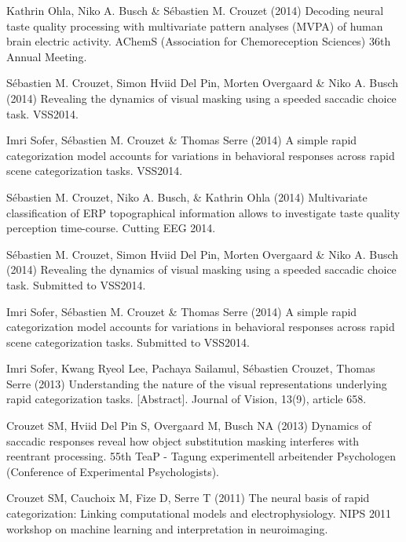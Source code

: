 \documentclass[margin,line]{resume}
\begin{document}
\begin{resume}
	\footnotesize %
	
	Kathrin Ohla, Niko A. Busch \& Sébastien M. Crouzet (2014) Decoding neural taste quality processing with multivariate pattern analyses (MVPA) of human brain electric activity. AChemS (Association for Chemoreception Sciences) 36th Annual Meeting.

	\vspace{-2mm} Sébastien M. Crouzet, Simon Hviid Del Pin, Morten Overgaard \& Niko A. Busch (2014) Revealing the dynamics of visual masking using a speeded saccadic choice task. VSS2014.

	\vspace{-2mm} Imri Sofer, Sébastien M. Crouzet \& Thomas Serre (2014) A simple rapid categorization model accounts for variations in behavioral responses across rapid scene categorization tasks. VSS2014.

	\vspace{-2mm} Sébastien M. Crouzet, Niko A. Busch, \& Kathrin Ohla (2014) Multivariate classification of ERP topographical information allows to investigate taste quality perception time-course. Cutting EEG 2014.

  	\vspace{-2mm} Sébastien M. Crouzet, Simon Hviid Del Pin, Morten Overgaard \& Niko A. Busch (2014) Revealing the dynamics of visual masking using a speeded saccadic choice task. Submitted to VSS2014.

  	\vspace{-2mm} Imri Sofer, Sébastien M. Crouzet \& Thomas Serre (2014) A simple rapid categorization model accounts for variations in behavioral responses across rapid scene categorization tasks. Submitted to VSS2014.
	
	\vspace{-2mm} Imri Sofer, Kwang Ryeol Lee, Pachaya Sailamul, Sébastien Crouzet, Thomas Serre (2013) Understanding the nature of the visual representations underlying rapid categorization tasks. [Abstract]. Journal of Vision, 13(9), article 658.

	\vspace{-2mm} Crouzet SM, Hviid Del Pin S, Overgaard M, Busch NA (2013) Dynamics of saccadic responses reveal how object substitution masking interferes with reentrant processing. 55th TeaP - Tagung experimentell arbeitender Psychologen (Conference of Experimental Psychologists).

	\vspace{-2mm} Crouzet SM, Cauchoix M, Fize D, Serre T (2011) The neural basis of rapid categorization: Linking computational models and electrophysiology. NIPS 2011 workshop on machine learning and interpretation in neuroimaging.


\end{resume}
\end{document}

